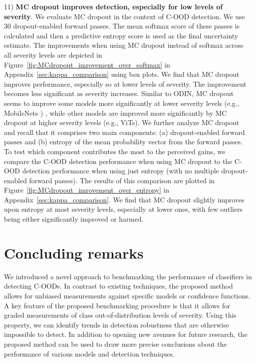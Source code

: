\documentclass[table]{article} \usepackage{PRIMEarxiv}
\begin{document}
11) \textbf{MC dropout improves detection, especially for low levels of severity}.
We evaluate MC dropout \cite{gal2016dropout}
in the context of C-OOD detection.
We use 30 dropout-enabled forward passes. 
The mean softmax score of these passes is calculated and then a predictive entropy score is used as the final uncertainty estimate.
The improvements when using MC dropout instead of softmax across all severity levels are depicted in Figure~\ref{fig:MCdropout_imrovement_over_softmax} in Appendix~\ref{sec:kappa_comparison} using box plots. 
We find that MC dropout improves performance, especially so at lower levels of severity. The improvement becomes less significant as severity increases.
Similar to ODIN, MC dropout seems to improve some models more significantly at lower severity levels (e.g., MobileNets \citep{DBLP:conf/iccv/HowardPALSCWCTC19})
, while other models are improved more significantly by MC dropout at higher severity levels (e.g., ViTs).
We further analyze MC dropout and recall that it comprises two main components: 
(a) dropout-enabled forward passes and (b) entropy of the mean probability vector from the forward passes. To test which component contributes the most to the perceived gains, we compare the C-OOD detection performance when using MC dropout to the C-OOD detection performance when using just entropy (with no multiple dropout-enabled forward passes). The results of this comparison are plotted in Figure~\ref{fig:MCdropout_imrovement_over_entropy} in Appendix~\ref{sec:kappa_comparison}. 
We find that MC dropout slightly improves upon entropy at most severity levels, especially at lower ones, with few outliers being either significantly improved or harmed. 


\section{Concluding remarks}
We introduced a novel approach to benchmarking the performance of classifiers in detecting C-OODs. In contrast to existing techniques, the proposed method allows for unbiased measurements against specific models or confidence functions. A key feature of the proposed benchmarking procedure is that it allows for graded measurements of class out-of-distribution levels of severity. Using this property, we can identify trends in detection robustness that are otherwise impossible to detect.  In addition to opening new avenues for future research, the proposed method can be used to draw more precise conclusions about the performance of various models and detection techniques.
\end{document}
